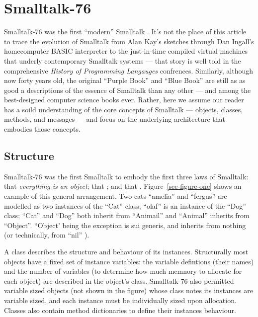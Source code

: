\section{Smalltalk-76}

Smalltalk-76 was the first ``modern'' Smalltalk
\cite{ingalls-evolution-smalltalk-hopl2020,ingalls-smalltalk76-popl1978}.
It's not the place of this article to trace the evolution of Smalltalk
from Alan Kay's sketches through Dan Ingall's homecomputer BASIC
interpreter to the just-in-time compiled virtual machines that underly
contemporary Smalltalk systems \cite{kay-history-smalltalk-hopl1993}
--- that story is well told in the comprehensive \textit{History of
  Programming Langauges} confrences. Similarly, although now forty
years old, the original ``Purple Book'' and ``Blue Book'' are still as
as good a descriptions of the essence of Smalltalk than any other
\cite{smalltalk-bluebook,smalltalk-purplebook} --- and among the
best-designed computer science books ever. Rather, here we assume our
reader has a soild understanding of the core concepts of Smalltalk ---
objects, classes, methods, and messages --- and focus on the
underlying architecture that embodies those concepts.


\subsection{Structure}

Smalltalk-76 was the first Smalltalk to embody the first three laws of
Smalltalk: that \textit{everything is an object}; that ; and that
. Figure~\ref{see-figure-one} shows an example of this
general arrangement.  Two cats ``amelia'' and ``fergus'' are modelled
as two instances of the ``Cat'' class; ``olaf'' is an instance of the
``Dog'' class; ``Cat'' and ``Dog'' both inherit from ``Animail'' and
``Animal'' inherits from ``Object''.  ``Object' being the exception is
sui generis, and inherits from nothing (or technically, from ``nil''
\cite{tony-hoare-billion-dollars}).



A class describes the structure and behaviour of its instances.
Structurally most objects have a fixed set of instance variables: the
variable defintions (their names) and the number of variables (to
determine how much memnory to allocate for each object) are described
in the object's class. Smalltalk-76 also permitted variable sized
objects (not shown in the figure) whose class notes its instances are
variable sized, and each instance must be individually sized upon
allocation.  Classes also contain method dictionaries to define their
instances behaviour. 

